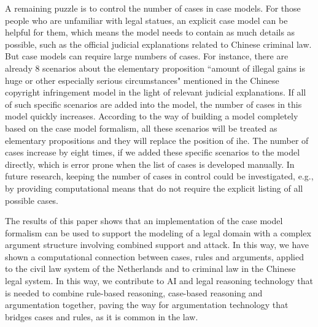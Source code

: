 \documentclass{IOS-Book-Article}
\begin{document}
A remaining puzzle is to control the number of cases in case models. For those people who are unfamiliar with legal statues, an explicit case model can be helpful for them, which means the model needs to contain as much details as possible, such as the official judicial explanations related to Chinese criminal law. But case models can require large numbers of cases. For instance, there are already 8 scenarios about the elementary proposition ``amount of illegal gains is huge or other especially serious circumstances" mentioned in the Chinese copyright infringement model in the light of relevant judicial explanations. If all of such specific scenarios are added into the model, the number of cases in this model quickly increases. According to the way of building a model completely based on the case model formalism, all these scenarios will be treated as elementary propositions and they will replace the position of  $\textrm{ihe}$. The number of cases increase by eight times, if we added these specific scenarios to the model directly, which is error prone when the list of cases is developed manually. In future research, keeping the number of cases in control could be investigated, e.g., by providing computational means that do not require the explicit listing of all possible cases. 

The results of this paper shows that an implementation of the case model formalism can be used to support the modeling of a legal domain with a complex argument structure involving combined support and attack. In this way, we have shown a computational connection between cases, rules and arguments, applied to the civil law system of the Netherlands and to criminal law in the Chinese legal system. 
In this way, we contribute to AI and legal reasoning technology that is needed to combine rule-based reasoning, case-based reasoning and argumentation together, paving the way for argumentation technology that bridges cases and rules, as it is common in the law.

\footnotesize


\end{document}
